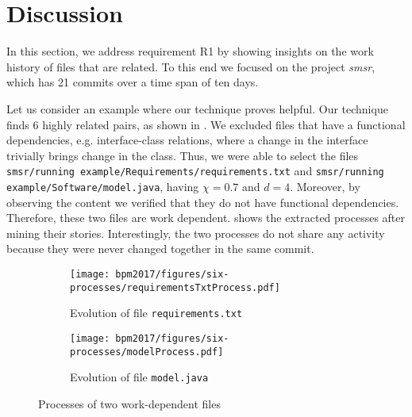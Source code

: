 \section{Discussion}
\label{subsec:qualitative-eval}

In this section, we address requirement R1 by showing insights on the work history of files that are related. To this end we focused on the project \emph{smsr}, which has 21 commits over a time span of ten days.

Let us consider an example where our technique proves helpful. Our technique finds 6 highly related pairs, as shown in . We excluded files that have a functional dependencies, e.g. interface-class relations, where a change in the interface trivially brings change in the class. Thus, we were able to select the files \texttt{smsr/running example/Requirements/requirements.txt} and \texttt{smsr/running example/Software/model.java}, having $\chi=0.7$ and $d=4$. Moreover, by observing the content we verified that they do not have functional dependencies. Therefore, these two files are work dependent.
 shows the extracted processes after mining their stories. Interestingly, the two processes do not share any activity because they were never changed together in the same commit.

\begin{figure}[t]
	\begin{subfigure}[t]{\textwidth}
		\centering
		\texttt{[image: bpm2017/figures/six-processes/requirementsTxtProcess.pdf]}
		\caption{Evolution of file \texttt{requirements.txt}}
		\label{subfig:requirements-file-process}
	\end{subfigure}
	\begin{subfigure}[ht]{\textwidth}
		\centering
		\texttt{[image: bpm2017/figures/six-processes/modelProcess.pdf]}
		\caption{Evolution of file \texttt{model.java}}
		\label{subfig:model-file-process}
	\end{subfigure}
	\caption{Processes of two work-dependent files}
	\label{fig:evaluated-processes}
\end{figure}

